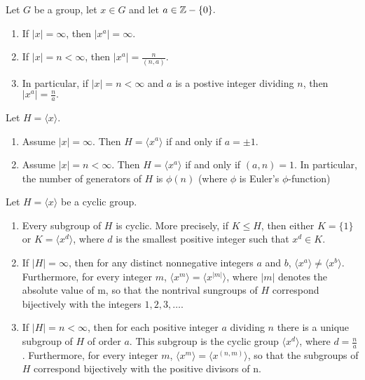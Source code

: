 \documentclass[../main]{subfiles}
\begin{document}
 
 \begin{prop}
  Let $G$ be a group, let $x\in G$ and let $a\in \mathbb{Z}-\{0\}.$
  \begin{enumerate}
   \item If $|x| = \infty$, then $|x^a| = \infty$.
   \item If $|x| = n < \infty$, then $|x^a|=\frac{n}{(n,a)}$.
   \item In particular, if $|x|=n<\infty$ and $a$ is a postive integer dividing $n$, then $|x^a|=\frac{n}{a}.$
  \end{enumerate}
 \end{prop}

 
 \begin{prop}
  Let $H=\langle x\rangle$.
  \begin{enumerate}
   \item Assume $|x|= \infty$. Then $H=\langle x^a \rangle$ if and only if $a=\pm 1$.
   \item Assume $|x| = n <\infty$. Then $H=\langle x^a \rangle$ if and only if $(a,n)=1$. In particular, the number of generators of $H$ is $\phi (n)$ (where $\phi$ is Euler's $\phi$-function)
  \end{enumerate}
 \end{prop}

 
 
 \begin{thm}
  Let $H=\langle x \rangle$ be a cyclic group. 
  \begin{enumerate}
   \item Every subgroup of $H$ is cyclic. More precisely, if $K\leq H$, then either $K=\{1\}$ or $K=\langle x^d \rangle$, where $d$ is the smallest positive integer such that $x^d \in K$.
   \item If $|H| = \infty$, then for any distinct nonnegative integers $a$ and $b$, $\langle x^a \rangle \neq \langle x^b \rangle$. Furthermore, for every integer $m$, $\langle x^m \rangle = \langle x^{|m|} \rangle$, where $|m|$ denotes the absolute value of m, so that the nontrival sungroups of $H$ correspond bijectively with the integers $1,2,3,\ldots$.
   \item If $|H| = n <\infty$, then for each positive integer $a$ dividing $n$ there is a unique subgroup of $H$ of order $a$. This subgroup is the cyclic group $\langle x^d \rangle$, where $d=\frac{n}{a}$. Furthermore, for every integer $m$, $\langle x^m \rangle = \langle x^{(n,m)} \rangle$, so that the subgroups of $H$ correspond bijectively with the positive divisors of n.
  \end{enumerate}
 \end{thm}
\end{document}
